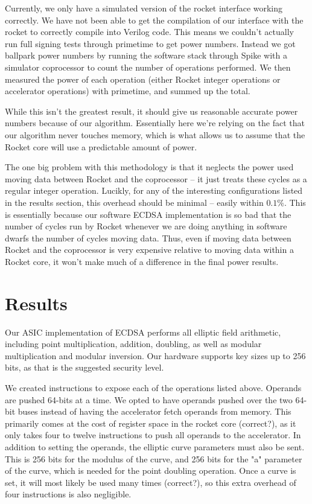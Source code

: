\documentclass[twocolumn]{article}
\begin{document}
Currently, we only have a simulated version of the rocket interface
working correctly.  We have not been able to get the compilation of
our interface with the rocket to correctly compile into Verilog code.
This means we couldn't actually run full signing tests through
primetime to get power numbers.  Instead we got ballpark power numbers
by running the software stack through Spike with a simulator
coprocessor to count the number of operations performed.  We then
measured the power of each operation (either Rocket integer operations
or accelerator operations) with primetime, and summed up the total.

While this isn't the greatest result, it should give us reasonable
accurate power numbers because of our algorithm.  Essentially here
we're relying on the fact that our algorithm never touches memory,
which is what allows us to assume that the Rocket core will use a
predictable amount of power.

The one big problem with this methodology is that it neglects the
power used moving data between Rocket and the coprocessor -- it just
treats these cycles as a regular integer operation.  Lucikly, for any
of the interesting configurations listed in the results section, this
overhead should be minimal -- easily within $0.1\%$.  This is
essentially because our software ECDSA implementation is so bad that
the number of cycles run by Rocket whenever we are doing anything in
software dwarfs the number of cycles moving data.  Thus, even if
moving data between Rocket and the coprocessor is very expensive
relative to moving data within a Rocket core, it won't make much of a
difference in the final power results.

\section{Results}

Our ASIC implementation of ECDSA performs all elliptic field
arithmetic, including point multiplication, addition, doubling, as
well as modular multiplication and modular inversion. Our hardware
supports key sizes up to 256 bits, as that is the suggested security
level.

We created instructions to expose each of the operations listed
above. Operands are pushed 64-bits at a time. We opted to have
operands pushed over the two 64-bit buses instead of having the
accelerator fetch operands from memory. This primarily comes at the
cost of register space in the rocket core (correct?), as it only takes
four to twelve instructions to push all operands to the
accelerator. In addition to setting the operands, the elliptic curve
parameters must also be sent. This is 256 bits for the modulus of the
curve, and 256 bits for the "a" parameter of the curve, which is
needed for the point doubling operation. Once a curve is set, it will
most likely be used many times (correct?), so this extra overhead of
four instructions is also negligible.
\end{document}
